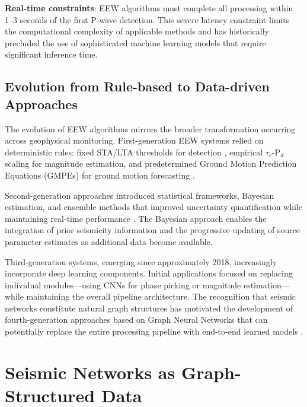 \documentclass[review,authoryear]{elsarticle}
\begin{document}
\textbf{Real-time constraints}: EEW algorithms must complete all processing within 1--3 seconds of the first P-wave detection. This severe latency constraint limits the computational complexity of applicable methods and has historically precluded the use of sophisticated machine learning models that require significant inference time.

\subsection{Evolution from Rule-based to Data-driven Approaches}

The evolution of EEW algorithms mirrors the broader transformation occurring across geophysical monitoring. First-generation EEW systems relied on deterministic rules: fixed STA/LTA thresholds for detection \citep{allen1978automatic}, empirical $\tau_c$-P$_d$ scaling for magnitude estimation, and predetermined Ground Motion Prediction Equations (GMPEs) for ground motion forecasting \citep{abrahamson2014nga, boore2014nga}.

Second-generation approaches introduced statistical frameworks, Bayesian estimation, and ensemble methods that improved uncertainty quantification while maintaining real-time performance \citep{satriano2011earthquake}. The Bayesian approach enables the integration of prior seismicity information and the progressive updating of source parameter estimates as additional data become available.

Third-generation systems, emerging since approximately 2018, increasingly incorporate deep learning components. Initial applications focused on replacing individual modules---using CNNs for phase picking \citep{ross2018generalized, zhu2019phasenet} or magnitude estimation---while maintaining the overall pipeline architecture. The recognition that seismic networks constitute natural graph structures has motivated the development of fourth-generation approaches based on Graph Neural Networks that can potentially replace the entire processing pipeline with end-to-end learned models \citep{vandenende2020automated, mcbrearty2023earthquake}.


\section{Seismic Networks as Graph-Structured Data}
\label{sec:seismic_graphs}
\end{document}
